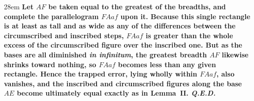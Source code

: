 \documentclass[border=4pt]{standalone}
\begin{document}
\begin{varwidth}{28em}
\large\bfseries
Let $AF$ be taken equal to the greatest of the breadths, and complete the parallelogram $FAaf$ upon it. Because this single rectangle is at least as tall and as wide as any of the differences between the circumscribed and inscribed steps, $FAaf$ is greater than the whole excess of the circumscribed figure over the inscribed one. But as the bases are all diminished \emph{in infinitum}, the greatest breadth $AF$ likewise shrinks toward nothing, so $FAaf$ becomes less than any given rectangle. Hence the trapped error, lying wholly within $FAaf$, also vanishes, and the inscribed and circumscribed figures along the base $AE$ become ultimately equal exactly as in \textbf{Lemma~II}. \textit{Q.E.D.}
\end{varwidth}
\end{document}
